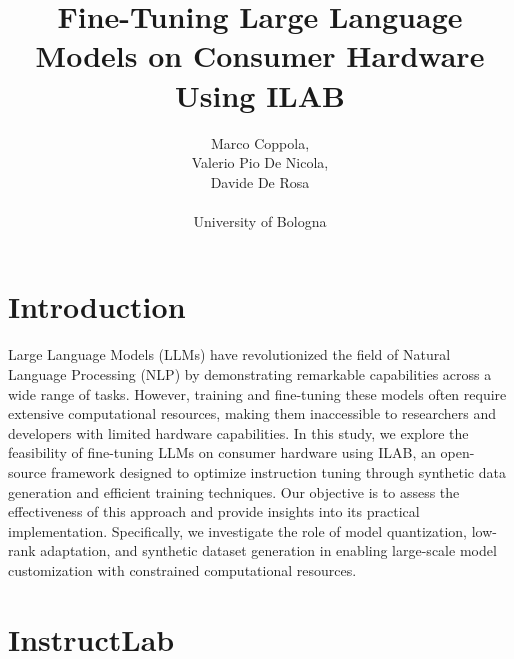 \documentclass[12pt]{article}
\title{Fine-Tuning Large Language Models on Consumer Hardware Using ILAB}
\author{Marco Coppola,\\
Valerio Pio De Nicola,\\
Davide De Rosa \\ \\
University of Bologna}
\date{}
\begin{document}
\maketitle

\section{Introduction}
Large Language Models (LLMs) have revolutionized the field of Natural Language Processing (NLP) by demonstrating remarkable capabilities across a wide range of tasks. However, training and fine-tuning these models often require extensive computational resources, making them inaccessible to researchers and developers with limited hardware capabilities. In this study, we explore the feasibility of fine-tuning LLMs on consumer hardware using ILAB, an open-source framework designed to optimize instruction tuning through synthetic data generation and efficient training techniques. Our objective is to assess the effectiveness of this approach and provide insights into its practical implementation. Specifically, we investigate the role of model quantization, low-rank adaptation, and synthetic dataset generation in enabling large-scale model customization with constrained computational resources.

\section{InstructLab}
\end{document}
